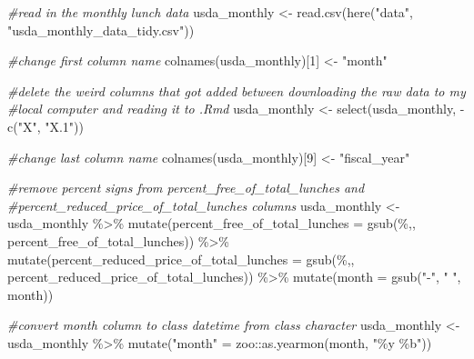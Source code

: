 \documentclass[
]{article}
\newenvironment{Shaded}{\begin{snugshade}}{\end{snugshade}}
\newcommand{\AttributeTok}[1]{\textcolor[rgb]{0.77,0.63,0.00}{#1}}
\newcommand{\CommentTok}[1]{\textcolor[rgb]{0.56,0.35,0.01}{\textit{#1}}}
\newcommand{\DecValTok}[1]{\textcolor[rgb]{0.00,0.00,0.81}{#1}}
\newcommand{\FunctionTok}[1]{\textcolor[rgb]{0.00,0.00,0.00}{#1}}
\newcommand{\NormalTok}[1]{#1}
\newcommand{\OtherTok}[1]{\textcolor[rgb]{0.56,0.35,0.01}{#1}}
\newcommand{\SpecialCharTok}[1]{\textcolor[rgb]{0.00,0.00,0.00}{#1}}
\newcommand{\StringTok}[1]{\textcolor[rgb]{0.31,0.60,0.02}{#1}}
\begin{document}
\begin{Shaded}
\begin{Highlighting}[]
\CommentTok{\#read in the monthly lunch data }
\NormalTok{usda\_monthly }\OtherTok{\textless{}{-}} \FunctionTok{read.csv}\NormalTok{(}\FunctionTok{here}\NormalTok{(}\StringTok{"data"}\NormalTok{, }\StringTok{"usda\_monthly\_data\_tidy.csv"}\NormalTok{))}
\end{Highlighting}
\end{Shaded}

\begin{Shaded}
\begin{Highlighting}[]
\CommentTok{\#change first column name }
\FunctionTok{colnames}\NormalTok{(usda\_monthly)[}\DecValTok{1}\NormalTok{] }\OtherTok{\textless{}{-}} \StringTok{"month"}

\CommentTok{\#delete the weird columns that got added between downloading the raw data to my }
\CommentTok{\#local computer and reading it to .Rmd}
\NormalTok{usda\_monthly }\OtherTok{\textless{}{-}} \FunctionTok{select}\NormalTok{(usda\_monthly, }\SpecialCharTok{{-}}\FunctionTok{c}\NormalTok{(}\StringTok{"X"}\NormalTok{, }\StringTok{"X.1"}\NormalTok{))}

\CommentTok{\#change last column name}
\FunctionTok{colnames}\NormalTok{(usda\_monthly)[}\DecValTok{9}\NormalTok{] }\OtherTok{\textless{}{-}} \StringTok{"fiscal\_year"}
\end{Highlighting}
\end{Shaded}

\begin{Shaded}
\begin{Highlighting}[]
\CommentTok{\#remove percent signs from percent\_free\_of\_total\_lunches and }
\CommentTok{\#percent\_reduced\_price\_of\_total\_lunches columns}
\NormalTok{usda\_monthly }\OtherTok{\textless{}{-}}\NormalTok{ usda\_monthly }\SpecialCharTok{\%\textgreater{}\%} 
 \FunctionTok{mutate}\NormalTok{(}\AttributeTok{percent\_free\_of\_total\_lunches =} \FunctionTok{gsub}\NormalTok{(}\StringTok{\textquotesingle{}\%\textquotesingle{}}\NormalTok{,}\StringTok{\textquotesingle{}\textquotesingle{}}\NormalTok{, percent\_free\_of\_total\_lunches)) }\SpecialCharTok{\%\textgreater{}\%} 
  \FunctionTok{mutate}\NormalTok{(}\AttributeTok{percent\_reduced\_price\_of\_total\_lunches =} \FunctionTok{gsub}\NormalTok{(}\StringTok{\textquotesingle{}\%\textquotesingle{}}\NormalTok{,}\StringTok{\textquotesingle{}\textquotesingle{}}\NormalTok{, percent\_reduced\_price\_of\_total\_lunches)) }\SpecialCharTok{\%\textgreater{}\%} 
  \FunctionTok{mutate}\NormalTok{(}\AttributeTok{month =} \FunctionTok{gsub}\NormalTok{(}\StringTok{"{-}"}\NormalTok{, }\StringTok{" "}\NormalTok{, month))}

\CommentTok{\#convert month column to class datetime from class character}
\NormalTok{usda\_monthly }\OtherTok{\textless{}{-}}\NormalTok{ usda\_monthly }\SpecialCharTok{\%\textgreater{}\%} 
  \FunctionTok{mutate}\NormalTok{(}\StringTok{"month"} \OtherTok{=}\NormalTok{ zoo}\SpecialCharTok{::}\FunctionTok{as.yearmon}\NormalTok{(month, }\StringTok{"\%y \%b"}\NormalTok{))}
\end{Highlighting}
\end{Shaded}
\end{document}

